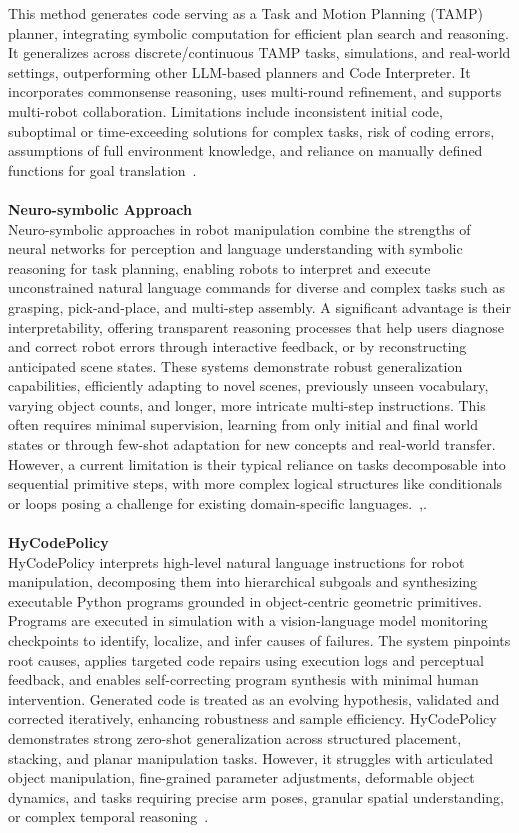 \documentclass[12pt]{extarticle}
\begin{document}
This method generates code serving as a Task and Motion Planning (TAMP) planner, integrating symbolic computation for efficient plan search and reasoning. It generalizes across discrete/continuous TAMP tasks, simulations, and real-world settings, outperforming other LLM-based planners and Code Interpreter. It incorporates commonsense reasoning, uses multi-round refinement, and supports multi-robot collaboration. Limitations include inconsistent initial code, suboptimal or time-exceeding solutions for complex tasks, risk of coding errors, assumptions of full environment knowledge, and reliance on manually defined functions for goal translation~\cite{code-as-symbolic-planner}. \\ \\
\textbf{Neuro-symbolic Approach} \\
Neuro-symbolic approaches in robot manipulation combine the strengths of neural networks for perception and language understanding with symbolic reasoning for task planning, enabling robots to interpret and execute unconstrained natural language commands for diverse and complex tasks such as grasping, pick-and-place, and multi-step assembly. A significant advantage is their interpretability, offering transparent reasoning processes that help users diagnose and correct robot errors through interactive feedback, or by reconstructing anticipated scene states. These systems demonstrate robust generalization capabilities, efficiently adapting to novel scenes, previously unseen vocabulary, varying object counts, and longer, more intricate multi-step instructions. This often requires minimal supervision, learning from only initial and final world states or through few-shot adaptation for new concepts and real-world transfer. However, a current limitation is their typical reliance on tasks decomposable into sequential primitive steps, with more complex logical structures like conditionals or loops posing a challenge for existing domain-specific languages.~\cite{enhancing-interpret},\cite{learning-neuro-symbolic}. \\ \\
\textbf{HyCodePolicy} \\
HyCodePolicy interprets high-level natural language instructions for robot manipulation, decomposing them into hierarchical subgoals and synthesizing executable Python programs grounded in object-centric geometric primitives. Programs are executed in simulation with a vision-language model monitoring checkpoints to identify, localize, and infer causes of failures. The system pinpoints root causes, applies targeted code repairs using execution logs and perceptual feedback, and enables self-correcting program synthesis with minimal human intervention. Generated code is treated as an evolving hypothesis, validated and corrected iteratively, enhancing robustness and sample efficiency. HyCodePolicy demonstrates strong zero-shot generalization across structured placement, stacking, and planar manipulation tasks. However, it struggles with articulated object manipulation, fine-grained parameter adjustments, deformable object dynamics, and tasks requiring precise arm poses, granular spatial understanding, or complex temporal reasoning~\cite{hycodepolicy}. \\ \\
\end{document}
